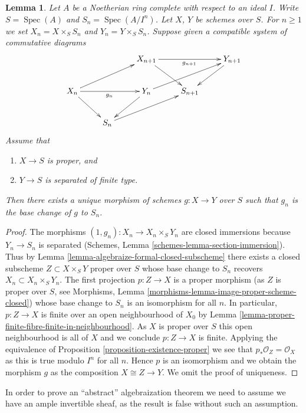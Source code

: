 \documentclass{stacks-project}
\theoremstyle{plain}
\newtheorem{lemma}[subsection]{Lemma}
\theoremstyle{definition}
\theoremstyle{remark}
\numberwithin{equation}{subsection}
\def\Spec{\mathop{\mathrm{Spec}}}
\begin{document}
\begin{lemma}
\label{lemma-algebraize-morphism}
Let $A$ be a Noetherian ring complete with respect to an ideal $I$.
Write $S = \Spec(A)$ and $S_n = \Spec(A/I^n)$. Let $X$, $Y$ be schemes
over $S$. For $n \geq 1$ we set $X_n = X \times_S S_n$ and
$Y_n = Y \times_S S_n$. Suppose given a compatible system of
commutative diagrams
$$
\xymatrix{
& & X_{n + 1} \ar[rd] \ar[rr]_{g_{n + 1}} & & Y_{n + 1} \ar[ld] \\
X_n \ar[rru] \ar[rd] \ar[rr]_{g_n} & & Y_n \ar[rru] \ar[ld] & S_{n + 1} \\
& S_n \ar[rru]
}
$$
Assume that
\begin{enumerate}
\item $X \to S$ is proper, and
\item $Y \to S$ is separated of finite type.
\end{enumerate}
Then there exists a unique morphism of schemes $g : X \to Y$
over $S$ such that $g_n$ is the base change of $g$ to $S_n$.
\end{lemma}

\begin{proof}
The morphisms $(1, g_n) : X_n \to X_n \times_S Y_n$ are closed immersions
because $Y_n \to S_n$ is separated
(Schemes, Lemma \ref{schemes-lemma-section-immersion}). Thus by
Lemma \ref{lemma-algebraize-formal-closed-subscheme}
there exists a closed subscheme $Z \subset X \times_S Y$
proper over $S$ whose base change to $S_n$ recovers
$X_n \subset X_n \times_S Y_n$. The first projection $p : Z \to X$
is a proper morphism (as $Z$ is proper over $S$, see
Morphisms, Lemma \ref{morphisms-lemma-image-proper-scheme-closed})
whose base change to $S_n$ is an isomorphism
for all $n$. In particular, $p : Z \to X$ is finite over an open
neighbourhood of $X_0$ by
Lemma \ref{lemma-proper-finite-fibre-finite-in-neighbourhood}.
As $X$ is proper over $S$ this open neighbourhood is all of $X$
and we conclude $p : Z \to X$ is finite.
Applying the equivalence of Proposition \ref{proposition-existence-proper}
we see that $p_*\mathcal{O}_Z = \mathcal{O}_X$ as this is true
modulo $I^n$ for all $n$. Hence $p$ is an isomorphism and we obtain
the morphism $g$ as the composition $X \cong Z \to Y$.
We omit the proof of uniqueness.
\end{proof}

\noindent
In order to prove an ``abstract'' algebraization theorem we need
to assume we have an ample invertible sheaf, as the result is false
without such an assumption.
\end{document}

